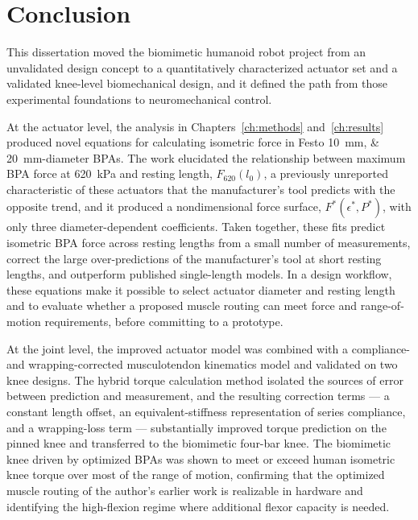 \chapter{Conclusion}\label{ch:conclusion}
\graphicspath{{../Figures/60-conclusion/}}

This dissertation moved the biomimetic humanoid robot project from an unvalidated design concept to a quantitatively characterized actuator set and a validated knee-level biomechanical design, and it defined the path from those experimental foundations to neuromechanical control.

At the actuator level, the analysis in Chapters~\ref{ch:methods} and~\ref{ch:results} produced novel equations for calculating isometric force in Festo \qtylist{10;20}{\mm}-diameter BPAs. The work elucidated the relationship between maximum BPA force at \qty{620}{\kPa} and resting length, $F_{620}(l_0)$, a previously unreported characteristic of these actuators that the manufacturer's tool predicts with the opposite trend, and it produced a nondimensional force surface, $F^*(\epsilon^*,P^*)$, with only three diameter-dependent coefficients. Taken together, these fits predict isometric BPA force across resting lengths from a small number of measurements, correct the large over-predictions of the manufacturer's tool at short resting lengths, and outperform published single-length models. In a design workflow, these equations make it possible to select actuator diameter and resting length and to evaluate whether a proposed muscle routing can meet force and range-of-motion requirements, before committing to a prototype.

At the joint level, the improved actuator model was combined with a compliance- and wrapping-corrected musculotendon kinematics model and validated on two knee designs. The hybrid torque calculation method isolated the sources of error between prediction and measurement, and the resulting correction terms --- a constant length offset, an equivalent-stiffness representation of series compliance, and a wrapping-loss term --- substantially improved torque prediction on the pinned knee and transferred to the biomimetic four-bar knee. The biomimetic knee driven by optimized BPAs was shown to meet or exceed human isometric knee torque over most of the range of motion, confirming that the optimized muscle routing of the author's earlier work is realizable in hardware and identifying the high-flexion regime where additional flexor capacity is needed.

